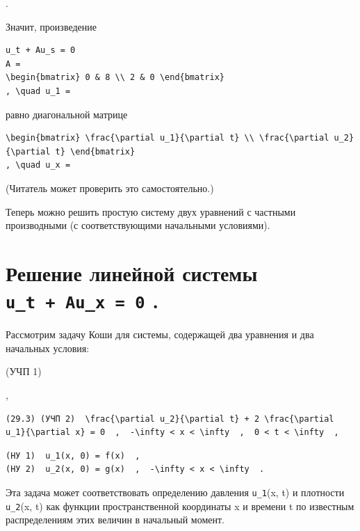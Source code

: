 \documentclass[
  ukrainian,
]{article}
\begin{document}
.

Значит, произведение

\begin{verbatim}
u_t + Au_s = 0
A =
\begin{bmatrix} 0 & 8 \\ 2 & 0 \end{bmatrix}
, \quad u_1 =
\end{verbatim}

равно диагональной матрице

\begin{verbatim}
\begin{bmatrix} \frac{\partial u_1}{\partial t} \\ \frac{\partial u_2}{\partial t} \end{bmatrix}
, \quad u_x =
\end{verbatim}

(Читатель может проверить это самостоятельно.)

Теперь можно решить простую систему двух уравнений с частными
производными (с соответствующими начальными условиями).

\section{\texorpdfstring{Решение линейной системы
\texttt{u\_t\ +\ Au\_x\ =\ 0}
.}{Решение линейной системы u\_t + Au\_x = 0 .}}\label{ux440ux435ux448ux435ux43dux438ux435-ux43bux438ux43dux435ux439ux43dux43eux439-ux441ux438ux441ux442ux435ux43cux44b-u_t-au_x-0-.}

Рассмотрим задачу Коши для системы, содержащей два уравнения и два
начальных условия:

(УЧП 1)

,

\begin{verbatim}
(29.3) (УЧП 2)  \frac{\partial u_2}{\partial t} + 2 \frac{\partial u_1}{\partial x} = 0  ,  -\infty < x < \infty  ,  0 < t < \infty  ,
\end{verbatim}

\begin{verbatim}
(HУ 1)  u_1(x, 0) = f(x)  ,
(HУ 2)  u_2(x, 0) = g(x)  ,  -\infty < x < \infty  .
\end{verbatim}

Эта задача может соответствовать определению давления \texttt{u\_1}(x,
t) и плотности \texttt{u\_2}(x, t) как функции пространственной
координаты x и времени t по известным распределениям этих величин в
начальный момент.
\end{document}
